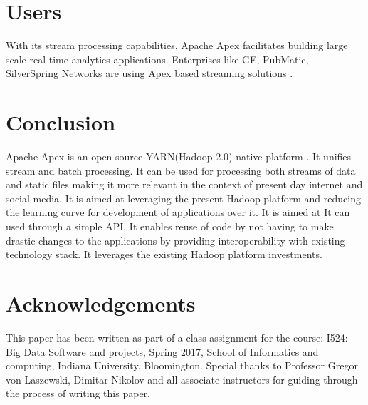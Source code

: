 \documentclass[9pt,twocolumn,twoside]{../../styles/osajnl}
\begin{document}
\section{Users}
With its stream processing capabilities, Apache Apex facilitates building large scale real-time analytics applications. Enterprises like GE, PubMatic, SilverSpring Networks are using Apex based streaming solutions \cite{www-apacheapexinslideshare}. 
\section{Conclusion}
Apache Apex is an open source YARN(Hadoop 2.0)-native platform \cite{www-apacheapexwiki}. It unifies stream and batch processing. It can be used for processing both streams of data and static files making it more relevant in the context of present day internet and social media. It is aimed at leveraging the present Hadoop platform and reducing the learning curve for development of applications over it. It is aimed at It can used through a simple API. It enables reuse of code by not having to make drastic changes to the applications by providing interoperability with existing technology stack. It leverages the existing Hadoop platform investments.



\section*{Acknowledgements}

This paper has been written as part of a class assignment for the course: 
I524: Big Data Software and projects, Spring 2017, School of Informatics and computing, Indiana University, Bloomington.
Special thanks to Professor Gregor von Laszewski, Dimitar Nikolov and all associate instructors for guiding through the process of writing this paper.




 
\end{document}
